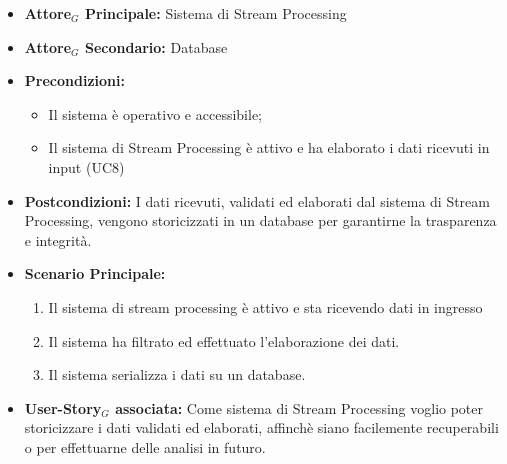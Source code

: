 \documentclass[11pt]{article}
\begin{document}
\begin{justify}
\label{UC9}
\begin{itemize}
    \item \textbf{Attore$_G$ Principale:} Sistema di Stream Processing
    \item \textbf{Attore$_G$ Secondario:} Database
    \item \textbf{Precondizioni:} 
        \begin{itemize}
          \item Il sistema è operativo e accessibile;
            \item Il sistema di Stream Processing è attivo e ha elaborato i dati ricevuti in input (UC8)
        \end{itemize}
      \item \textbf{Postcondizioni:} I dati ricevuti, validati ed elaborati dal sistema di Stream Processing, vengono storicizzati in un database per garantirne la trasparenza e integrità.\\
    \item \textbf{Scenario Principale:} 
        \begin{enumerate}
        \item Il sistema di stream processing è attivo e sta ricevendo dati in ingresso
        \item Il sistema ha filtrato ed effettuato l'elaborazione dei dati.
        \item Il sistema serializza i dati su un database. 
        \end{enumerate}
    \item \textbf{User-Story$_G$ associata:} Come sistema di Stream Processing voglio poter storicizzare i dati validati ed elaborati, affinchè siano facilemente recuperabili o per effettuarne delle analisi in futuro.
\end{itemize}



\end{justify}
\end{document}

